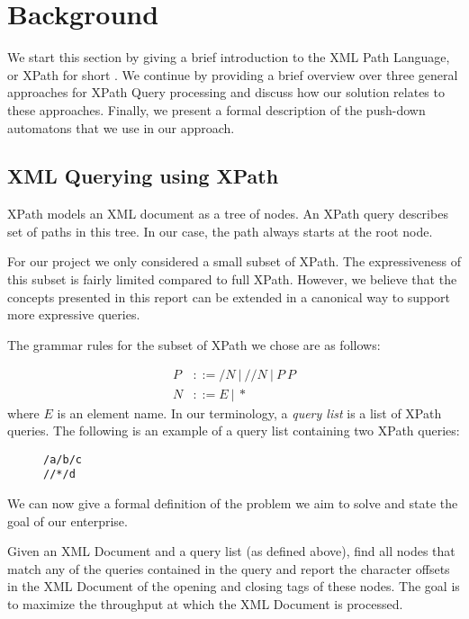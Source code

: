 \section{Background}\label{sec:background}
We start this section by giving a brief introduction to the XML Path Language,
or XPath for short \cite{xpathSpec}. We continue by providing a brief overview
over three general approaches for XPath Query processing and discuss how our
solution relates to these approaches. Finally, we present a formal description
of the push-down automatons that we use in our approach.

\subsection{XML Querying using XPath}
XPath models an XML document as a tree of nodes. An XPath query describes set
of paths in this tree. In our case, the path always starts at the root node.

For our project we only considered a small subset of XPath.  The expressiveness
of this subset is fairly limited compared to full XPath. However, we believe
that the concepts presented in this report can be extended in a canonical way
to support more expressive queries.

The grammar rules for the subset of XPath we chose are as follows:

\begin{align*}
    P &::= /N\ |\ //N\ |\ P\ P\\
    N &::= E\ |\ *
\end{align*}
where $E$ is an element name. In our terminology, a \emph{query list} is a list
of XPath queries. The following is an example of a query list containing two
XPath queries:

\begin{figure}[htb]
\centering
\texttt{/a/b/c}\\
\texttt{//*/d}
\end{figure}

We can now give a formal definition of the problem we aim to solve and state
the goal of our enterprise. 

 Given an XML Document and a query list (as
defined above), find all nodes that match any of the queries contained in the
query and report the character offsets in the XML Document of the opening and
closing tags of these nodes. The goal is to maximize the throughput at which
the XML Document is processed.

